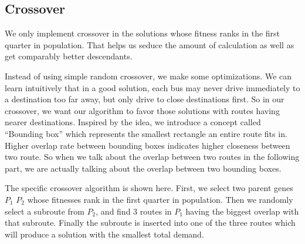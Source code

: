 \documentclass{llncs}
\begin{document}
\subsection{Crossover}
We only implement crossover in the solutions whose fitness ranks in the first quarter in population. That helps us seduce the amount of calculation as well as get comparably better descendants. 

Instead of using simple random crossover, we make some optimizations. We can learn intuitively that in a good solution, each bus may never  drive immediately to a destination too far away, but only drive to close destinations first. So in our crossover, we want our algorithm to favor those solutions with routes having nearer destinations. Inspired by the idea, we introduce a concept called ``Bounding box'' which represents the smallest rectangle an entire route fits in. Higher overlap rate between bounding boxes indicates higher closeness between two route. So when we talk about the overlap between two routes in the following part, we are actually talking about the overlap between two bounding boxes.

The specific crossover algorithm is shown here. First, we select two parent genes $P_1$ $P_2$ whose fitnesses rank in the first quarter in population. Then we randomly select a subroute from $P_2$, and find $3$ routes in $P_1$ having the biggest overlap with that subroute. Finally the subroute is inserted into one of the three routes which will produce a solution with the smallest total demand.
\end{document}
